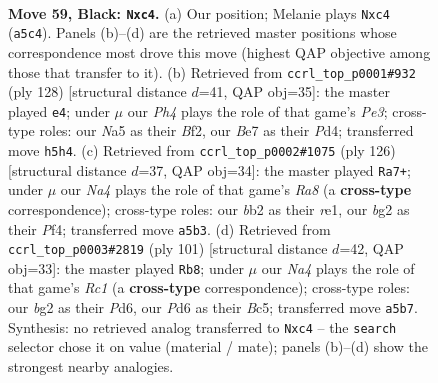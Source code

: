 \documentclass[11pt]{article}
\begin{document}
\clearpage

\begin{figure}[p]\centering
\begin{subfigure}{0.46\textwidth}\centering
\resizebox{\linewidth}{!}{%
\newchessgame
\chessboard[
  setfen={3r4/4b2p/p2p2k1/n3p2p/2P1P3/5P2/1B2K1B1/7R b - - 1 59},
  showmover=false,
  pgfstyle=straightmove, color=movearrow, markmove={a5-c4}
]}
\caption{}
\end{subfigure}\hfill
\begin{subfigure}{0.46\textwidth}\centering
\resizebox{\linewidth}{!}{%
\newchessgame
\chessboard[
  setfen={8/4b1k1/6p1/3B1p2/3P1P1p/r3P2P/4KBP1/8 w - - 14 65},
  showmover=false,
  pgfstyle=straightmove, color=movearrow, markmove={e3-e4}
]}
\caption{}
\end{subfigure}
\\[4pt]
\begin{subfigure}{0.46\textwidth}\centering
\resizebox{\linewidth}{!}{%
\newchessgame
\chessboard[
  setfen={R7/5k2/pB4p1/P2p1p2/5P1b/4P2P/7K/4r3 w - - 18 64},
  showmover=false,
  pgfstyle=straightmove, color=movearrow, markmove={a8-a7}
]}
\caption{}
\end{subfigure}\hfill
\begin{subfigure}{0.46\textwidth}\centering
\resizebox{\linewidth}{!}{%
\newchessgame
\chessboard[
  setfen={2r5/5p2/2Pp1kp1/2bP4/1p2R1PP/8/2B3K1/8 b - - 12 51},
  showmover=false,
  pgfstyle=straightmove, color=movearrow, markmove={c8-b8}
]}
\caption{}
\end{subfigure}
\caption{\textbf{Move 59, Black: \texttt{Nxc4}.} (a) Our position; Melanie plays \texttt{Nxc4} (\texttt{a5c4}). Panels (b)--(d) are the retrieved master positions whose correspondence most drove this move (highest QAP objective among those that transfer to it). (b) Retrieved from \texttt{ccrl\_top\_p0001\#932} (ply 128) [structural distance $d$=41, QAP obj=35]: the master played \texttt{e4}; under $\mu$ our \emph{Ph4} plays the role of that game's \emph{Pe3}; cross-type roles: our \emph{N}a5 as their \emph{B}f2, our \emph{B}e7 as their \emph{P}d4; transferred move \texttt{h5h4}. (c) Retrieved from \texttt{ccrl\_top\_p0002\#1075} (ply 126) [structural distance $d$=37, QAP obj=34]: the master played \texttt{Ra7+}; under $\mu$ our \emph{Na4} plays the role of that game's \emph{Ra8} (a \textbf{cross-type} correspondence); cross-type roles: our \emph{b}b2 as their \emph{r}e1, our \emph{b}g2 as their \emph{P}f4; transferred move \texttt{a5b3}. (d) Retrieved from \texttt{ccrl\_top\_p0003\#2819} (ply 101) [structural distance $d$=42, QAP obj=33]: the master played \texttt{Rb8}; under $\mu$ our \emph{Na4} plays the role of that game's \emph{Rc1} (a \textbf{cross-type} correspondence); cross-type roles: our \emph{b}g2 as their \emph{P}d6, our \emph{P}d6 as their \emph{B}c5; transferred move \texttt{a5b7}. Synthesis: no retrieved analog transferred to \texttt{Nxc4} -- the \texttt{search} selector chose it on value (material / mate); panels (b)--(d) show the strongest nearby analogies.}
\label{fig:thought-m117}
\end{figure}
\end{document}
